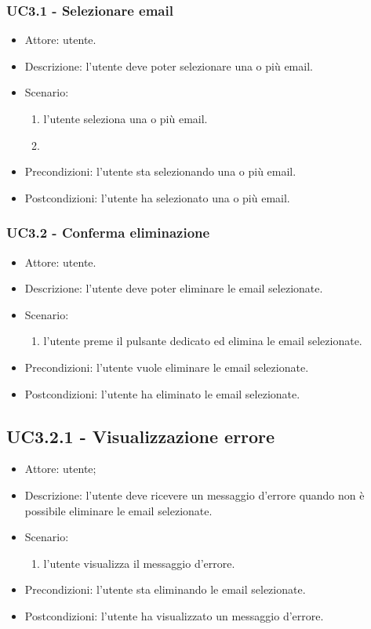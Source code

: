     \subsubsection{UC3.1 - Selezionare email}
    \begin{itemize}
        \item Attore: utente.
        \item Descrizione: l'utente deve poter selezionare una o più email.
        \item Scenario:
            \begin{enumerate}
            \item l'utente seleziona una o più email.
            \item \end{enumerate}
        \item Precondizioni: l'utente sta selezionando una o più email.
        \item Postcondizioni: l'utente ha selezionato una o più email.
    \end{itemize}

    \subsubsection{UC3.2 - Conferma eliminazione}
    \begin{itemize}
        \item Attore: utente.
        \item Descrizione: l'utente deve poter eliminare le email selezionate.
        \item Scenario:
        \begin{enumerate}
        \item l'utente preme il pulsante dedicato ed elimina le email selezionate.
        \end{enumerate}
        \item Precondizioni: l'utente vuole eliminare le email selezionate.
        \item Postcondizioni: l'utente ha eliminato le email selezionate.
    \end{itemize}

    \subsection{UC3.2.1 - Visualizzazione errore}
    \begin{itemize}
        \item Attore: utente;
        \item Descrizione: l'utente deve ricevere un messaggio d'errore quando non è possibile eliminare le email selezionate.
        \item Scenario:
        \begin{enumerate}
        \item l'utente visualizza il messaggio d'errore.
        \end{enumerate}
        \item Precondizioni: l'utente sta eliminando le email selezionate.
        \item Postcondizioni: l'utente ha visualizzato un messaggio d'errore.
    \end{itemize}

